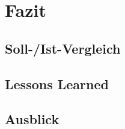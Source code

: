 
\section{Fazit}
\blindtext
\subsection{Soll-/Ist-Vergleich}
\subsection{Lessons Learned}
\subsection{Ausblick}